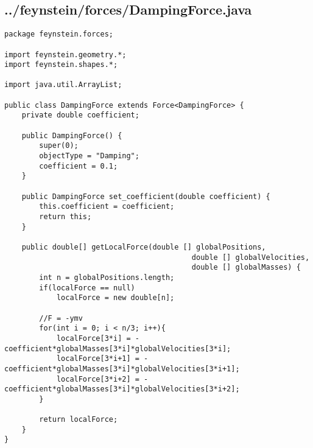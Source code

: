 \subsection*{../feynstein/forces/DampingForce.java}
\begin{lstlisting}
package feynstein.forces;

import feynstein.geometry.*;
import feynstein.shapes.*;

import java.util.ArrayList;

public class DampingForce extends Force<DampingForce> {
	private double coefficient;

    public DampingForce() {
		super(0);
		objectType = "Damping";
		coefficient = 0.1;
    }
 
    public DampingForce set_coefficient(double coefficient) {
		this.coefficient = coefficient;
		return this;
    }

	public double[] getLocalForce(double [] globalPositions,
										   double [] globalVelocities,
										   double [] globalMasses) {
		int n = globalPositions.length;
		if(localForce == null)
			localForce = new double[n];
		
		//F = -ymv
		for(int i = 0; i < n/3; i++){
			localForce[3*i] = -coefficient*globalMasses[3*i]*globalVelocities[3*i];
			localForce[3*i+1] = -coefficient*globalMasses[3*i]*globalVelocities[3*i+1];
			localForce[3*i+2] = -coefficient*globalMasses[3*i]*globalVelocities[3*i+2];
		}
		
		return localForce;
	}
}
\end{lstlisting}

